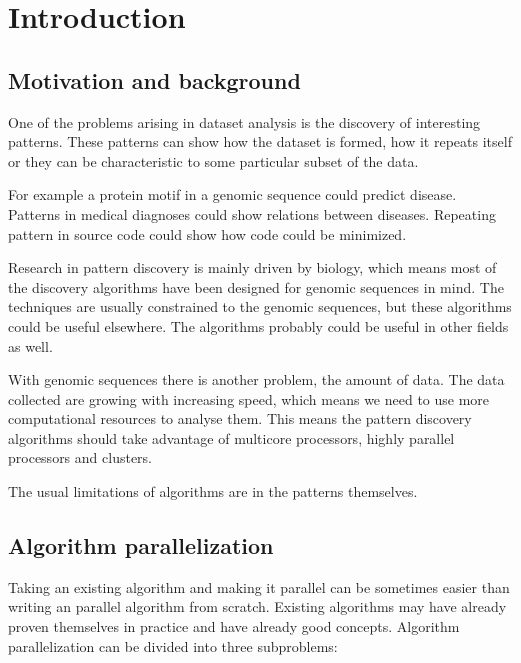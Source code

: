 \chapter{Introduction}
\label{c:introduction}

\section{Motivation and background}

One of the problems arising in dataset analysis is the discovery of interesting patterns. These patterns can show how the dataset is formed, how it repeats itself or they can be characteristic to some particular subset of the data.

For example a protein motif in a genomic sequence could predict disease. Patterns in medical diagnoses could show relations between diseases. Repeating pattern in source code could show how code could be minimized.

Research in pattern discovery is mainly driven by biology, which means most of the discovery algorithms have been designed for genomic sequences in mind. The techniques are usually constrained to the genomic sequences, but these algorithms could be useful elsewhere. The algorithms probably could be useful in other fields as well.

With genomic sequences there is another problem, the amount of data\cite{HowIsGenomeDoing}. The data collected are growing with increasing speed, which means we need to use more computational resources to analyse them. This means the pattern discovery algorithms should take advantage of multicore processors, highly parallel processors and clusters.




The usual limitations of algorithms are in the patterns themselves.


\section{Algorithm parallelization}

Taking an existing algorithm and making it parallel can be sometimes easier than writing an parallel algorithm from scratch. Existing algorithms may have already proven themselves in practice and have already good concepts. Algorithm parallelization can be divided into three subproblems:

